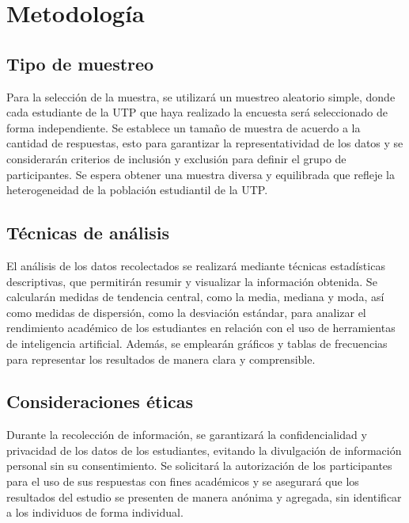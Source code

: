 \documentclass{article}
\newenvironment{metodologia}{}{}
\begin{document}
\begin{metodologia}
  \section{Metodología}

  \subsection{Tipo de muestreo}

  Para la selección de la muestra, se utilizará un muestreo aleatorio simple, donde cada estudiante de la UTP que haya realizado la encuesta será seleccionado de forma independiente. Se establece un tamaño de muestra de acuerdo a la cantidad de respuestas, esto para garantizar la representatividad de los datos y se considerarán criterios de inclusión y exclusión para definir el grupo de participantes. Se espera obtener una muestra diversa y equilibrada que refleje la heterogeneidad de la población estudiantil de la UTP.

  \subsection{Técnicas de análisis}

  El análisis de los datos recolectados se realizará mediante técnicas estadísticas descriptivas, que permitirán resumir y visualizar la información obtenida. Se calcularán medidas de tendencia central, como la media, mediana y moda, así como medidas de dispersión, como la desviación estándar, para analizar el rendimiento académico de los estudiantes en relación con el uso de herramientas de inteligencia artificial. Además, se emplearán gráficos y tablas de frecuencias para representar los resultados de manera clara y comprensible.

  \subsection{Consideraciones éticas}

  Durante la recolección de información, se garantizará la confidencialidad y privacidad de los datos de los estudiantes, evitando la divulgación de información personal sin su consentimiento. Se solicitará la autorización de los participantes para el uso de sus respuestas con fines académicos y se asegurará que los resultados del estudio se presenten de manera anónima y agregada, sin identificar a los individuos de forma individual.


\end{metodologia}
\end{document}
